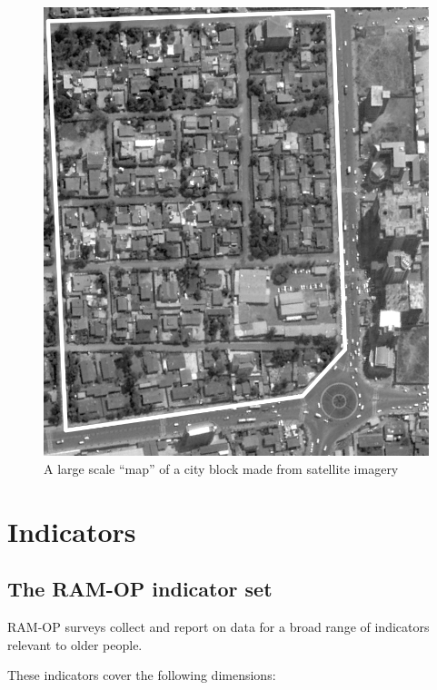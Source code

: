 \documentclass[12pt,a4paper]{book}
\theoremstyle{definition}
\theoremstyle{definition}
\theoremstyle{definition}
\theoremstyle{remark}
\begin{document}
\begin{figure}[H]

{\centering \includegraphics{figures/stage2sample15} 

}

\caption{A large scale “map” of a city block made from satellite imagery}\label{fig:sample29}
\end{figure}

\hypertarget{indicators}{%
\chapter{Indicators}\label{indicators}}

\hypertarget{the-ram-op-indicator-set}{%
\section{The RAM-OP indicator set}\label{the-ram-op-indicator-set}}

RAM-OP surveys collect and report on data for a broad range of
indicators relevant to older people.

These indicators cover the following dimensions:
\end{document}
